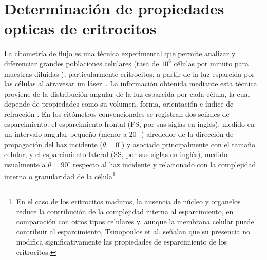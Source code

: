 \section{Determinación de propiedades opticas de eritrocitos}
\label{section:flow_cytometry}

La citometría de flujo es una técnica experimental que permite analizar y diferenciar grandes poblaciones celulares (tasa de $10^{6}$ células por minuto para muestras diluidas \cite{ricoFlowCytometry2021}), particularmente eritrocitos, a partir de la luz esparcida por las células al atravesar un láser~\cite{bectondickinsonIntroductionFlowCytometry2000}. La información obtenida mediante esta técnica proviene de la distribución angular de la luz esparcida por cada célula, la cual depende de propiedades como su volumen, forma, orientación e índice de refracción \cite{bectondickinsonIntroductionFlowCytometry2000}. En los citómetros convencionales se registran dos señales de esparcimiento: el esparcimiento frontal (FS, por sus siglas en inglés), medido en un intervalo angular pequeño (menor a $20^{\circ}$ \cite{ricoFlowCytometry2021}) alrededor de la dirección de propagación del haz incidente ($\theta=0^{\circ}$) y asociado principalmente con el tamaño celular, y el esparcimiento lateral (SS, por sus siglas en inglés), medido usualmente a $\theta=90^\circ$  respecto al haz incidente \cite{ricoFlowCytometry2021} y relacionado con la complejidad interna o granularidad de la célula\footnote{En el caso de los eritrocitos maduros, la ausencia de núcleo y organelos \cite{palTextbookMedicalPhysiology2021} reduce la contribución de la complejidad interna al esparcimiento, en comparación con otros tipos celulares \cite{palTextbookMedicalPhysiology2021} y, aunque la membrana celular puede contribuir al esparcimiento, Tsinopoulos et al. \cite{lightAggregatedRBCS2002} señalan que su presencia no modifica significativamente las propiedades de esparcimiento de los eritrocitos.} \cite{mckinnonFlowCytometryOverview2018}. 

